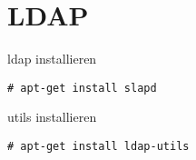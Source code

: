 \chapter{LDAP}
ldap installieren
\begin{lstlisting}[style=Bash]
# apt-get install slapd
\end{lstlisting}
utils installieren
\begin{lstlisting}[style=Bash]
# apt-get install ldap-utils
\end{lstlisting}
